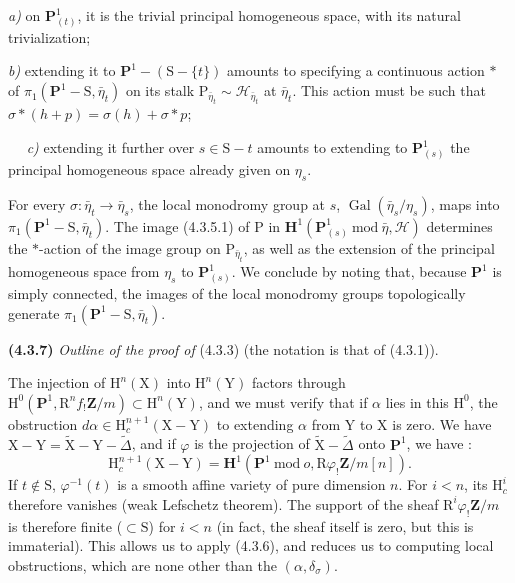 \documentclass[11pt,leqno]{article}
\newcommand{\Page}[1]{\ifvmode\noindent\else\unskip\ \fi{\footnotesize\textcolor{gray}{[p.\,#1]}}\ \ignorespaces}
\begin{document}
\noindent\textit{a)} on \(\mathbf{P}^1_{(t)}\), it is the trivial principal homogeneous space, with its natural trivialization;

\noindent\textit{b)} extending it to \(\mathbf{P}^1-(\mathrm{S}-\{t\})\) amounts to specifying a continuous action \(\ast\) of \(\pi_1(\mathbf{P}^1-\mathrm{S},\bar\eta_t)\) on its stalk \(\mathrm{P}_{\bar\eta_t}\sim\mathscr{H}_{\bar\eta_t}\) at \(\bar\eta_t\). This action must be such that \(\sigma\ast(h+p)=\sigma(h)+\sigma\ast p\);

\Page{225}
\noindent\textit{c)} extending it further over \(s\in\mathrm{S}-t\) amounts to extending to \(\mathbf{P}^1_{(s)}\) the principal homogeneous space already given on \(\eta_s\).

For every \(\sigma:\bar{\eta}_t\to\bar{\eta}_s\), the local monodromy group at \(s\), \(\operatorname{Gal}(\bar{\eta}_s/\eta_s)\), maps into \(\pi_1(\mathbf{P}^1-\mathrm{S},\bar{\eta}_t)\). The image (4.3.5.1) of \(\mathrm{P}\) in \(\mathbf{H}^1(\mathbf{P}^1_{(s)}\ \mathrm{mod}\ \bar{\eta},\mathscr{H})\) determines the \(*\)-action of the image group on \(\mathrm{P}_{\bar{\eta}_t}\), as well as the extension of the principal homogeneous space from \(\eta_s\) to \(\mathbf{P}^1_{(s)}\). We conclude by noting that, because \(\mathbf{P}^1\) is simply connected, the images of the local monodromy groups topologically generate \(\pi_1(\mathbf{P}^1-\mathrm{S},\bar{\eta}_t)\).

\textbf{(4.3.7)} \textit{Outline of the proof of} (4.3.3) (the notation is that of (4.3.1)).

The injection of \(\mathrm{H}^n(\mathrm{X})\) into \(\mathrm{H}^n(\mathrm{Y})\) factors through \(\mathrm{H}^0(\mathbf{P}^1,\mathrm{R}^nf_!\mathbf{Z}/m)\subset\mathrm{H}^n(\mathrm{Y})\), and we must verify that if \(\alpha\) lies in this \(\mathrm{H}^0\), the obstruction \(d\alpha\in\mathrm{H}_c^{n+1}(\mathrm{X}-\mathrm{Y})\) to extending \(\alpha\) from \(\mathrm{Y}\) to \(\mathrm{X}\) is zero. We have \(\mathrm{X}-\mathrm{Y}=\widetilde{\mathrm{X}}-\mathrm{Y}-\widetilde{\Delta}\), and if \(\varphi\) is the projection of \(\widetilde{\mathrm{X}}-\widetilde{\Delta}\) onto \(\mathbf{P}^1\), we have :
\[
\mathrm{H}_c^{n+1}(\mathrm{X}-\mathrm{Y})
=\mathbf{H}^1(\mathbf{P}^1\ \mathrm{mod}\ o,\mathrm{R}\varphi_!\mathbf{Z}/m[n]).
\]
If \(t\notin\mathrm{S}\), \(\varphi^{-1}(t)\) is a smooth affine variety of pure dimension \(n\). For \(i<n\), its \(\mathrm{H}_c^i\) therefore vanishes (weak Lefschetz theorem). The support of the sheaf \(\mathrm{R}^i\varphi_!\mathbf{Z}/m\) is therefore finite (\(\subset\mathrm{S}\)) for \(i<n\) (in fact, the sheaf itself is zero, but this is immaterial). This allows us to apply (4.3.6), and reduces us to computing local obstructions, which are none other than the \((\alpha,\delta_\sigma)\).
\end{document}

